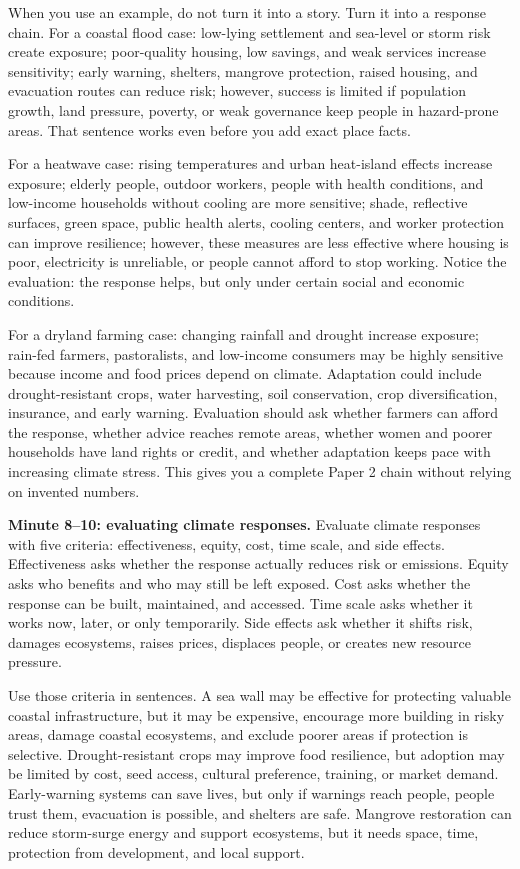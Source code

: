 \documentclass[11pt,a4paper]{article}
\begin{document}
When you use an example, do not turn it into a story. Turn it into a response
chain. For a coastal flood case: low-lying settlement and sea-level or storm
risk create exposure; poor-quality housing, low savings, and weak services
increase sensitivity; early warning, shelters, mangrove protection, raised
housing, and evacuation routes can reduce risk; however, success is limited if
population growth, land pressure, poverty, or weak governance keep people in
hazard-prone areas. That sentence works even before you add exact place facts.

For a heatwave case: rising temperatures and urban heat-island effects increase
exposure; elderly people, outdoor workers, people with health conditions, and
low-income households without cooling are more sensitive; shade, reflective
surfaces, green space, public health alerts, cooling centers, and worker
protection can improve resilience; however, these measures are less effective
where housing is poor, electricity is unreliable, or people cannot afford to
stop working. Notice the evaluation: the response helps, but only under certain
social and economic conditions.

For a dryland farming case: changing rainfall and drought increase exposure;
rain-fed farmers, pastoralists, and low-income consumers may be highly
sensitive because income and food prices depend on climate. Adaptation could
include drought-resistant crops, water harvesting, soil conservation, crop
diversification, insurance, and early warning. Evaluation should ask whether
farmers can afford the response, whether advice reaches remote areas, whether
women and poorer households have land rights or credit, and whether adaptation
keeps pace with increasing climate stress. This gives you a complete Paper 2
chain without relying on invented numbers.

\textbf{Minute 8--10: evaluating climate responses.}
Evaluate climate responses with five criteria: effectiveness, equity, cost,
time scale, and side effects. Effectiveness asks whether the response actually
reduces risk or emissions. Equity asks who benefits and who may still be left
exposed. Cost asks whether the response can be built, maintained, and accessed.
Time scale asks whether it works now, later, or only temporarily. Side effects
ask whether it shifts risk, damages ecosystems, raises prices, displaces
people, or creates new resource pressure.

Use those criteria in sentences. A sea wall may be effective for protecting
valuable coastal infrastructure, but it may be expensive, encourage more
building in risky areas, damage coastal ecosystems, and exclude poorer areas if
protection is selective. Drought-resistant crops may improve food resilience,
but adoption may be limited by cost, seed access, cultural preference, training,
or market demand. Early-warning systems can save lives, but only if warnings
reach people, people trust them, evacuation is possible, and shelters are safe.
Mangrove restoration can reduce storm-surge energy and support ecosystems, but
it needs space, time, protection from development, and local support.
\end{document}
